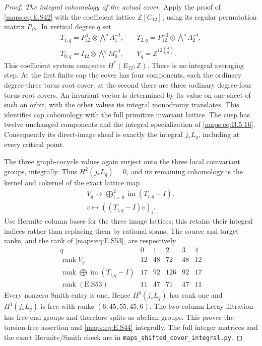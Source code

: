\begin{proof}
\emph{The integral cohomology of the actual cover.}
Apply the proof of \eqref{maps:eq:E.S42} with the coefficient lattice
$\mathbb Z[C_{12}]$, using its regular permutation matrix
$P_{12}$. In vertical degree $q$ set
\[
 \begin{aligned}
 T_{1,q}=P_{12}^4\otimes\bigwedge^q A_1^{-t},\quad
 &T_{2,q}=P_{12}^{-3}\otimes\bigwedge^q A_2^{-t},\\
 T_{0,q}=I_{12}\otimes\bigwedge^q M_0^{-t},
 &V_q=\mathbb Z^{12\binom4q}.
 \end{aligned}
 \tag{E.S52}\label{maps:eq:E.S52}
\]
This coefficient system computes $H^*(E_{12};\mathbb Z)$.
There is no integral averaging step. At the first finite
cap the cover has four components, each the ordinary
degree-three torus root cover; at the second there are
three ordinary degree-four torus root covers. An invariant
vector is determined by its value on one sheet of such
an orbit, with the other values its integral monodromy
translates. This identifies cap cohomology with the full
primitive invariant lattice. The cusp has twelve unchanged
components and the integral specialization of \eqref{maps:eq:B.5.16}.
Consequently its direct-image sheaf is exactly the integral
$j_*L_q$, including at every critical point.

The three graph-cocycle values again surject onto the
three local coinvariant groups, integrally. Thus $H^2(j_*L_q)=0$,
and its remaining cohomology is the kernel and cokernel
of the exact lattice map
\[
 \begin{gathered}
 V_q\longrightarrow
        \bigoplus_{i=0}^2\operatorname{im}(T_{i,q}-I),\\
           v\longmapsto((T_{i,q}-I)v)_i.
 \end{gathered}
 \tag{E.S53}\label{maps:eq:E.S53}
\]
Use Hermite column bases for the three image lattices;
this retains their integral indices rather than replacing
them by rational spans. The source and target ranks,
and the rank of \eqref{maps:eq:E.S53}, are respectively
\[
 \begin{array}{c|rrrrr}
 q&0&1&2&3&4\\ \hline
 \operatorname{rank}V_q&12&48&72&48&12\\
 \operatorname{rank}\bigoplus\operatorname{im}(T_{i,q}-I)
                      &17&92&126&92&17\\
 \operatorname{rank}(\text{E.S53})&11&47&71&47&11
 \end{array}
 \tag{E.S54}\label{maps:eq:E.S54}
\]
Every nonzero Smith entry is one. Hence $H^0(j_*L_q)$
has rank one and $H^1(j_*L_q)$ is free with ranks
$(6,45,55,45,6)$. The two-column Leray filtration has
free end groups and therefore splits as abelian groups.
This proves the torsion-free assertion and \eqref{maps:eq:E.S44}
integrally. The full integer matrices and the exact
Hermite/Smith check are in
\texttt{maps\_shifted\_cover\_integral.py}.


\end{proof}
